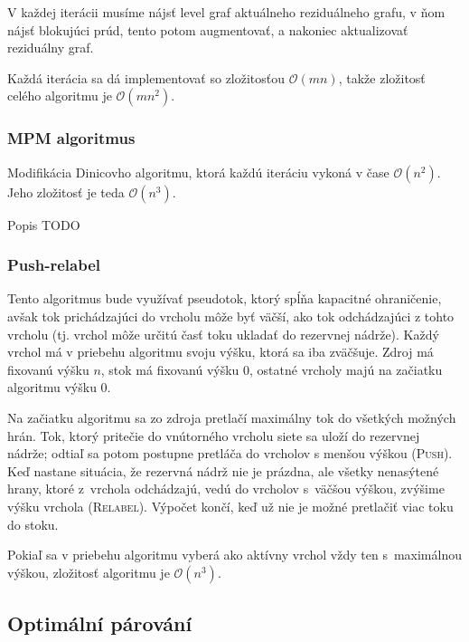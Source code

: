 V každej iterácii musíme nájsť level graf aktuálneho reziduálneho grafu,
v ňom nájsť blokujúci prúd, tento potom augmentovať, a nakoniec 
aktualizovať reziduálny graf.

Každá iterácia sa dá implementovať so zložitosťou $\mathcal{O}(mn)$, takže
zložitosť celého algoritmu je $\mathcal{O}(mn^2)$.

\subsubsection*{MPM algoritmus}
Modifikácia Dinicovho algoritmu, ktorá každú iteráciu vykoná v čase $\mathcal{O}(n^2)$.
Jeho zložitosť je teda $\mathcal{O}(n^3)$.

Popis TODO

\subsubsection*{Push-relabel}
Tento algoritmus bude využívať pseudotok, ktorý spĺňa kapacitné
ohraničenie, avšak tok prichádzajúci do vrcholu môže byť väčší, 
ako tok odchádzajúci z tohto vrcholu (tj. vrchol môže určitú časť
toku ukladať do rezervnej nádrže). Každý vrchol má v priebehu 
algoritmu svoju výšku, ktorá sa iba zväčšuje. Zdroj má fixovanú
výšku $n$, stok má fixovanú výšku $0$, ostatné vrcholy majú na začiatku
algoritmu výšku $0$.

Na začiatku algoritmu sa zo zdroja pretlačí maximálny tok
do všetkých možných hrán. Tok, ktorý pritečie do vnútorného vrcholu
siete sa uloží do rezervnej nádrže; odtiaľ sa potom postupne pretláča
do vrcholov s menšou výškou (\textsc{Push}). Keď nastane situácia, že 
rezervná nádrž nie je prázdna, ale všetky nenasýtené hrany, ktoré z~vrchola
odchádzajú, vedú do vrcholov s~väčšou výškou, zvýšime výšku vrchola
(\textsc{Relabel}). Výpočet končí, keď už nie je možné pretlačiť viac
toku do stoku.

Pokiaľ sa v priebehu algoritmu vyberá ako aktívny vrchol vždy ten
s~maximálnou výškou, zložitosť algoritmu je $\mathcal{O}(n^3)$.

\subsection{Optimální párování}


